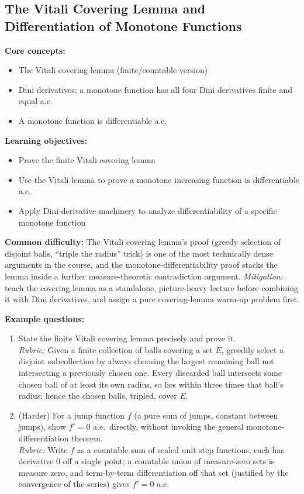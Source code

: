 \documentclass[11pt]{article}
\begin{document}
\subsection{The Vitali Covering Lemma and Differentiation of Monotone Functions}

\textbf{Core concepts:}
\begin{itemize}[nosep]
\item The Vitali covering lemma (finite/countable version)
\item Dini derivatives; a monotone function has all four Dini derivatives finite and equal a.e.
\item A monotone function is differentiable a.e.
\end{itemize}

\textbf{Learning objectives:}
\begin{itemize}[nosep]
\item Prove the finite Vitali covering lemma
\item Use the Vitali lemma to prove a monotone increasing function is differentiable a.e.
\item Apply Dini-derivative machinery to analyze differentiability of a specific monotone function
\end{itemize}

\textbf{Common difficulty:} The Vitali covering lemma's proof (greedy selection of disjoint balls, ``triple the radius'' trick) is one of the most technically dense arguments in the course, and the monotone-differentiability proof stacks the lemma inside a further measure-theoretic contradiction argument. \textit{Mitigation:} teach the covering lemma as a standalone, picture-heavy lecture before combining it with Dini derivatives, and assign a pure covering-lemma warm-up problem first.

\textbf{Example questions:}
\begin{enumerate}[nosep]
\item State the finite Vitali covering lemma precisely and prove it. \\
\textit{Rubric:} Given a finite collection of balls covering a set $E$, greedily select a disjoint subcollection by always choosing the largest remaining ball not intersecting a previously chosen one. Every discarded ball intersects some chosen ball of at least its own radius, so lies within three times that ball's radius; hence the chosen balls, tripled, cover $E$.
\item (Harder) For a jump function $f$ (a pure sum of jumps, constant between jumps), show $f'=0$ a.e.\ directly, without invoking the general monotone-differentiation theorem. \\
\textit{Rubric:} Write $f$ as a countable sum of scaled unit step functions; each has derivative $0$ off a single point; a countable union of measure-zero sets is measure zero, and term-by-term differentiation off that set (justified by the convergence of the series) gives $f'=0$ a.e.
\end{enumerate}
\end{document}
